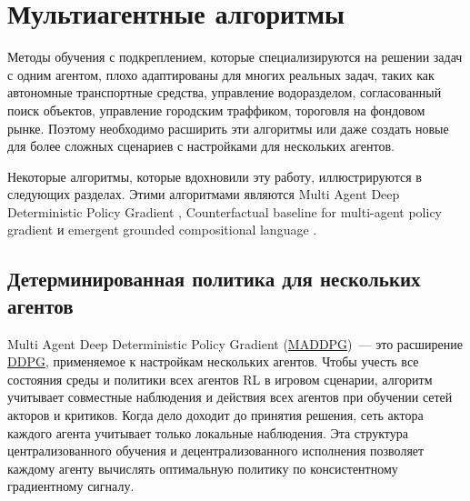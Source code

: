 \section{Мультиагентные алгоритмы} \label{ch2:ma-algs} %

Методы обучения с подкреплением, которые специализируются на решении задач с одним агентом, плохо адаптированы для многих реальных задач, таких как автономные транспортные средства, управление водоразделом, согласованный поиск объектов, управление городским траффиком, тороговля на фондовом рынке. Поэтому необходимо расширить эти алгоритмы или даже создать новые для более сложных сценариев с настройками для нескольких агентов.

Некоторые алгоритмы, которые вдохновили эту работу, иллюстрируются в следующих разделах. Этими алгоритмами являются Multi Agent Deep Deterministic Policy Gradient \cite{lowe2017multiagent}, Counterfactual baseline for multi-agent policy gradient \cite{foerster2017counterfactual} и emergent grounded compositional language \cite{mordatch2017emergence}.

\subsection{Детерминированная политика для нескольких агентов}

Multi Agent Deep Deterministic Policy Gradient (\hyperref[acr:maddpg]{MADDPG})~--- это расширение \hyperref[acr:ddpg]{DDPG}, применяемое к настройкам нескольких агентов. Чтобы учесть все состояния среды и политики всех агентов RL в игровом сценарии, алгоритм учитывает совместные наблюдения и действия всех агентов при обучении сетей акторов и критиков. Когда дело доходит до принятия решения, сеть актора каждого агента учитывает только локальные наблюдения. Эта структура централизованного обучения и децентрализованного исполнения позволяет каждому агенту вычислять оптимальную политику по консистентному градиентному сигналу. \cite{lowe2017multiagent}


